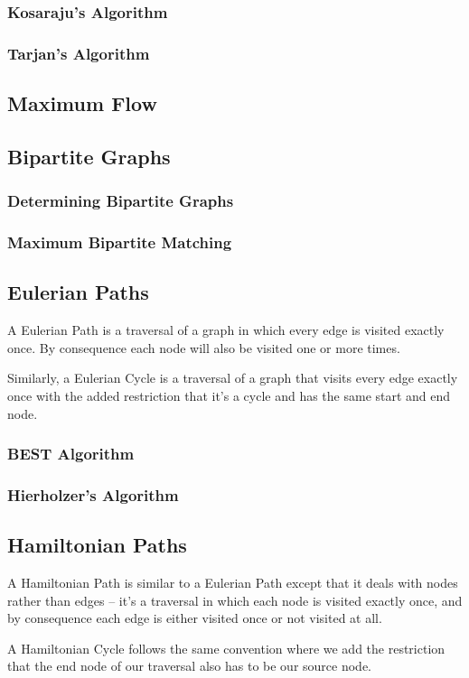 \subsubsection{Kosaraju's Algorithm}
\subsubsection{Tarjan's Algorithm}
\subsection{Maximum Flow}
\subsection{Bipartite Graphs}
\subsubsection{Determining Bipartite Graphs}
\subsubsection{Maximum Bipartite Matching}
\subsection{Eulerian Paths}

A Eulerian Path is a traversal of a graph in which every edge is visited exactly once. By consequence each node will also be visited one or more times.

Similarly, a Eulerian Cycle is a traversal of a graph that visits every edge exactly once with the added restriction that it's a cycle and has the same start and end node.

\subsubsection{BEST Algorithm}
\subsubsection{Hierholzer's Algorithm}
\subsection{Hamiltonian Paths}

A Hamiltonian Path is similar to a Eulerian Path except that it deals with nodes rather than edges -- it's a traversal in which each node is visited exactly once, and by consequence each edge is either visited once or not visited at all.

A Hamiltonian Cycle follows the same convention where we add the restriction that the end node of our traversal also has to be our source node.